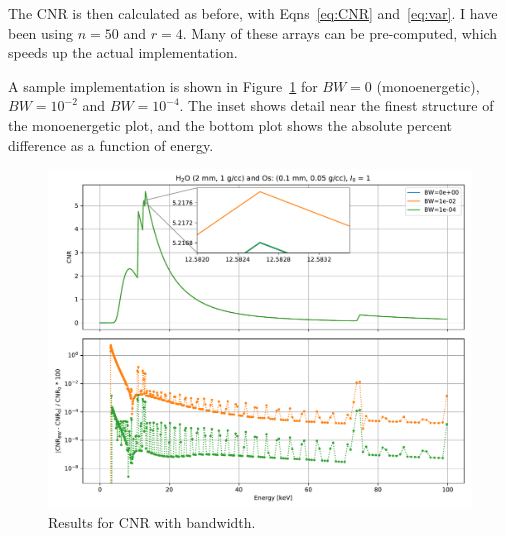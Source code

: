 \documentclass[11pt]{article}
\begin{document}
The CNR is then calculated as before, with Eqns~\ref{eq:CNR} and~\ref{eq:var}. I
have been using $n=50$ and $r=4$. Many of these arrays can be pre-computed,
which speeds up the actual implementation.

A sample implementation is shown in Figure~\ref{fig:results} for $BW=0$
(monoenergetic), $BW=10^{-2}$ and \newline$BW=10^{-4}$. The inset shows detail
near the finest structure of the monoenergetic plot, and the bottom plot
shows the absolute percent difference as a function of energy. 

\begin{figure}[H]
  \centering
  \includegraphics[width=\linewidth]{cnrwithbw}
  \caption{Results for CNR with bandwidth.}
  \label{fig:results}
\end{figure}



\end{document}

